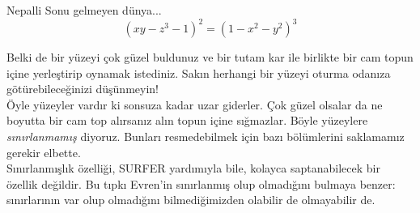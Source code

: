 \begin{surferPage}{Nepalli}
Sonu gelmeyen dünya... \\

\smallskip
\[(x y - z^3 -1)^2= (1 - x^2	- y^2)^3\]

\singlespacing
Belki de bir yüzeyi çok güzel buldunuz ve bir tutam kar ile birlikte bir cam topun içine yerleştirip oynamak istediniz. Sakın herhangi bir yüzeyi oturma odanıza götürebileceğinizi düşünmeyin!
\\
\singlespacing
Öyle yüzeyler vardır ki sonsuza kadar uzar giderler. Çok güzel olsalar da ne boyutta bir cam top alırsanız alın topun içine sığmazlar.
Böyle yüzeylere \textit{sınırlanmamış} diyoruz. Bunları resmedebilmek için bazı bölümlerini saklamamız gerekir elbette.
\\
\singlespacing
Sınırlanmışlık özelliği, SURFER yardımıyla bile, kolayca saptanabilecek bir özellik değildir.
Bu tıpkı Evren'in sınırlanmış olup olmadığını bulmaya benzer: sınırlarının var olup olmadığını bilmediğimizden olabilir de olmayabilir de.
\end{surferPage}
